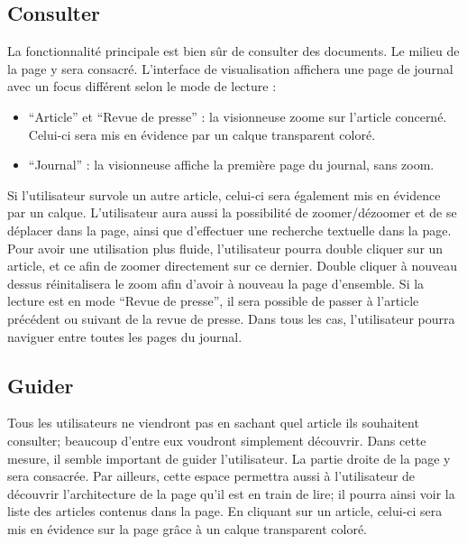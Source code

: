 \subsection{Consulter}
\label{sec:consultation_consulter}
La fonctionnalité principale est bien sûr de consulter des documents. Le milieu de la page y sera consacré.
L’interface de visualisation affichera une page de journal avec un focus différent selon le mode de lecture :
\begin{itemize}
\item “Article” et “Revue de presse” : la visionneuse zoome sur l’article concerné. Celui-ci sera mis en évidence par un calque transparent coloré.
\item “Journal” : la visionneuse affiche la première page du journal, sans zoom.
\end{itemize}
\bigskip
\par
Si l’utilisateur survole un autre article, celui-ci sera également mis en évidence par un calque.
	L’utilisateur aura aussi la possibilité de zoomer/dézoomer et de se déplacer dans la page, ainsi que d’effectuer une recherche textuelle dans la page. Pour avoir une utilisation plus fluide, l'utilisateur pourra double cliquer sur un article, et ce afin de zoomer directement sur ce dernier. Double cliquer à nouveau dessus réinitalisera le zoom afin d'avoir à nouveau la page d'ensemble. Si la lecture est en mode “Revue de presse”, il sera possible de passer à l’article précédent ou suivant de la revue de presse. Dans tous les cas, l'utilisateur pourra naviguer entre toutes les pages du journal.

\subsection{Guider}
\label{sec:consultation_guider}

	Tous les utilisateurs ne viendront pas en sachant quel article ils souhaitent consulter; beaucoup d’entre eux voudront simplement découvrir. Dans cette mesure, il semble important de guider l’utilisateur. La partie droite de la page y sera consacrée. Par ailleurs, cette espace permettra aussi à l'utilisateur de découvrir l'architecture de la page qu'il est en train de lire; il pourra ainsi voir la liste des articles contenus dans la page. En cliquant sur un article, celui-ci sera mis en évidence sur la page grâce à un calque transparent coloré.

